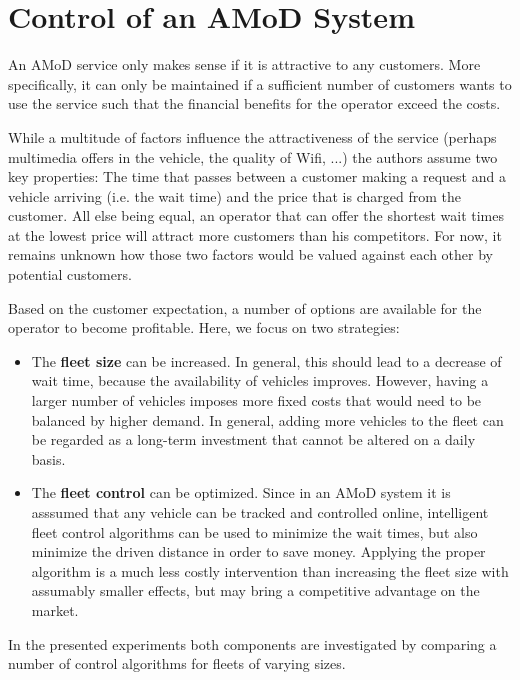 \section{Control of an AMoD System}
\label{sec:background}

An AMoD service only makes sense if it is attractive to any customers. More
specifically, it can only be maintained if a sufficient number of customers
wants to use the service such that the financial benefits for the operator
exceed the costs.

While a multitude of factors influence the attractiveness of the service (perhaps
multimedia offers in the vehicle, the quality of Wifi, ...) the authors assume
two key properties: The time that passes between a customer making a request
and a vehicle arriving (i.e. the wait time) and the price that is charged from
the customer. All else being equal, an operator that can offer the shortest wait
times at the lowest price will attract more customers than his competitors. For
now, it remains unknown how those two factors would be valued against each other
by potential customers.

Based on the customer expectation, a number of options are available for the
operator to become profitable. Here, we focus on two strategies:

\begin{itemize}
\item The \textbf{fleet size} can be increased. In general, this should lead to
a decrease of wait time, because the availability of vehicles improves. However,
having a larger number of vehicles imposes more fixed costs that would need to be
balanced by higher demand. In general, adding more vehicles to the fleet can be
regarded as a long-term investment that cannot be altered on a daily basis.
\item The \textbf{fleet control} can be optimized. Since in an AMoD system it is
asssumed that any vehicle can be tracked and controlled online, intelligent fleet
control algorithms can be used to minimize the wait times, but also minimize the
driven distance in order to save money. Applying the proper algorithm is a much
less costly intervention than increasing the fleet size with assumably smaller
effects, but may bring a competitive advantage on the market.
\end{itemize}

In the presented experiments both components are investigated by comparing a number
of control algorithms for fleets of varying sizes.

